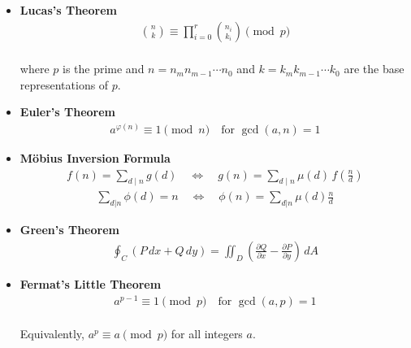 \begin{itemize}
    \item \textbf{Lucas's Theorem} \\
    \begin{equation*}
    \begin{aligned}
    \binom{n}{k} \equiv \prod_{i=0}^{r} \binom{n_i}{k_i} \pmod{p}
    \end{aligned}
    \end{equation*} \\
    where $p$ is the prime and $n=n_m n_{m-1} \cdots n_0$ and $k=k_m k_{m-1} \cdots k_0$ are the base representations of $p$.

    \item \textbf{Euler's Theorem} \\
    \begin{equation*}
    \begin{aligned}
    a^{\varphi(n)} \equiv 1 \pmod{n} \quad \text{for } \gcd(a, n) = 1
    \end{aligned}
    \end{equation*}

    \item \textbf{Möbius Inversion Formula} \\ 
    \begin{equation*}
    \begin{aligned}
    f(n) = \sum_{d \mid n} g(d)
\quad \Longleftrightarrow \quad
g(n) = \sum_{d \mid n} \mu(d)\, f\!\left(\frac{n}{d}\right)
    \end{aligned}
    \end{equation*}
    \begin{equation*}
    \begin{aligned}
    \sum_{d|n}\phi(d) = n \quad \Longleftrightarrow \quad \phi(n)=\sum_{d|n}\mu(d)\frac{n}{d}
    \end{aligned}
    \end{equation*}

    \item \textbf{Green's Theorem} \\
    \begin{equation*}
    \begin{aligned}
    \oint_{C} \left( P\,dx + Q\,dy \right)
=
\iint_{D} \left( \frac{\partial Q}{\partial x} - \frac{\partial P}{\partial y} \right)\, dA
    \end{aligned}
    \end{equation*}

    \item \textbf{Fermat's Little Theorem} \\
    \begin{equation*}
    \begin{aligned}
    a^{p-1} \equiv 1 \pmod{p} \quad \text{for } \gcd(a, p) = 1
    \end{aligned}
    \end{equation*} \\ 
    Equivalently, $a^p \equiv a \pmod{p}$ for all integers $a$.


\end{itemize}
